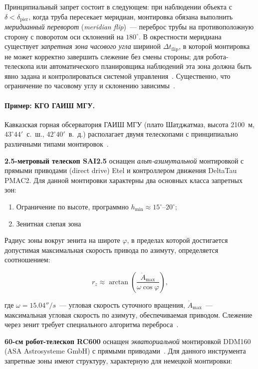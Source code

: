 Принципиальный запрет состоит в следующем: при наблюдении объекта с $\delta < \delta_{\text{pier}}$, когда труба пересекает меридиан, монтировка обязана выполнить \textit{меридианный переворот} (\textit{meridian flip})~--- переброс трубы на противоположную сторону с поворотом оси склонений на $180^\circ$. В окрестности меридиана существует \textit{запретная зона часового угла} шириной $\Delta t_{\text{flip}}$, в которой монтировка не может корректно завершить слежение без смены стороны; для робота-телескопа или автоматического планировщика наблюдений эта зона должна быть явно задана и контролироваться системой управления~\cite{EQMOD_Limits}\cite{EKOS_Flip}. Существенно, что ограничение по часовому углу и склонению зависимы~\cite{TPoint_Wallace}.

\paragraph{Пример: КГО ГАИШ МГУ.}

Кавказская горная обсерватория ГАИШ МГУ (плато Шатджатмаз, высота 2100~м, $43^\circ44'$~с.~ш., $42^\circ40'$~в.~д.) располагает двумя телескопами с принципиально различными типами монтировок~\cite{Shatsky2020}.

\textbf{2.5-метровый телескоп SAI2.5} оснащен \textit{альт-азимутальной} монтировкой с прямыми приводами (direct drive) Etel и контроллером движения DeltaTau PMAC2. Для данной монтировки характерны два основных класса запретных зон: 

\begin{enumerate}
    \item Ограничение по высоте, программно $h_{\min} \approx 15^\circ$--$20^\circ$; 
    \item Зенитная слепая зона
\end{enumerate}

Радиус зоны вокруг зенита на широте $\varphi$, в пределах которой достигается допустимая максимальная скорость привода по азимуту, определяется соотношением:

$$
r_z \approx \arctan\left(\frac{\dot{A}_{\max}}{\omega \cos\varphi}\right),
$$

где $\omega= 15.04''/{s}$~--- угловая скорость суточного вращения, $\dot{A}_{\max}$~--- максимальная угловая скорость по азимуту, обеспечиваемая приводом. Слежение через зенит требует специального алгоритма переброса~\cite{TPoint_Wallace}.

\textbf{60-см робот-телескоп RC600} оснащен \textit{экваториальной} монтировкой DDM160 (ASA Astrosysteme GmbH) с прямыми приводами~\cite{Shatsky2020}. Для данного инструмента запретные зоны имеют структуру, характерную для немецкой монтировки:

